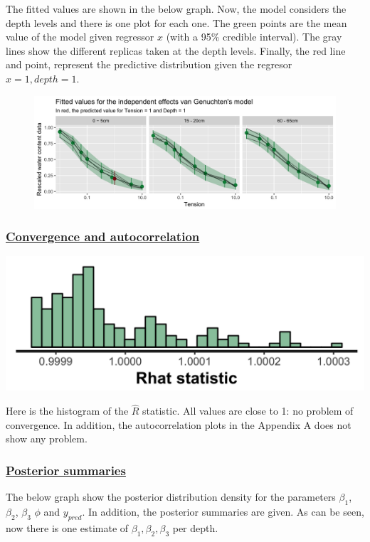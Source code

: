 \documentclass{article}
\begin{document}
The fitted values are shown in the below graph. Now, the model considers the depth levels and there is one plot for each one. The green points are the mean value of the model given regressor $x$ (with a 95\% credible interval). The gray lines show the different replicas taken at the depth levels. Finally, the red line and point, represent the predictive distribution given the regresor $x = 1, depth = 1$.\begin{figure}[ht!]
\centering
\includegraphics[width=16cm]{indep_3pars_pred.png}
\end{figure}

\subsubsection*{\underline{Convergence and autocorrelation}}
\begin{minipage}{0.50\textwidth}
\includegraphics[width=\linewidth]{indep_3pars_rhat.png}
\end{minipage}
\begin{minipage}{0.50\textwidth}
Here is the histogram of the $\widehat{R}$ statistic. All values are close to 1: no problem of convergence. In addition, the autocorrelation plots in the Appendix A does not show any problem.
\end{minipage}

\subsubsection*{\underline{Posterior summaries}}
The below graph show the posterior distribution density for the parameters $\beta_1$, $\beta_2$, $\beta_3$ $\phi$ and $y_{pred}$. In addition, the posterior summaries are given. As can be seen, now there is one estimate of $\beta_1,\beta_2,\beta_3$ per depth.
\end{document}
